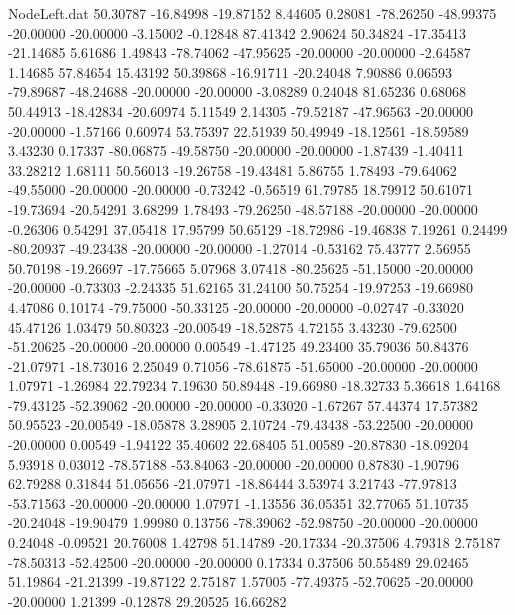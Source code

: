 \begin{filecontents}{NodeLeft.dat}
  50.30787  -16.84998  -19.87152     8.44605    0.28081  -78.26250  -48.99375  -20.00000  -20.00000   -3.15002   -0.12848   87.41342    2.90624
  50.34824  -17.35413  -21.14685     5.61686    1.49843  -78.74062  -47.95625  -20.00000  -20.00000   -2.64587    1.14685   57.84654   15.43192
  50.39868  -16.91711  -20.24048     7.90886    0.06593  -79.89687  -48.24688  -20.00000  -20.00000   -3.08289    0.24048   81.65236    0.68068
  50.44913  -18.42834  -20.60974     5.11549    2.14305  -79.52187  -47.96563  -20.00000  -20.00000   -1.57166    0.60974   53.75397   22.51939
  50.49949  -18.12561  -18.59589     3.43230    0.17337  -80.06875  -49.58750  -20.00000  -20.00000   -1.87439   -1.40411   33.28212    1.68111
  50.56013  -19.26758  -19.43481     5.86755    1.78493  -79.64062  -49.55000  -20.00000  -20.00000   -0.73242   -0.56519   61.79785   18.79912
  50.61071  -19.73694  -20.54291     3.68299    1.78493  -79.26250  -48.57188  -20.00000  -20.00000   -0.26306    0.54291   37.05418   17.95799
  50.65129  -18.72986  -19.46838     7.19261    0.24499  -80.20937  -49.23438  -20.00000  -20.00000   -1.27014   -0.53162   75.43777    2.56955
  50.70198  -19.26697  -17.75665     5.07968    3.07418  -80.25625  -51.15000  -20.00000  -20.00000   -0.73303   -2.24335   51.62165   31.24100
  50.75254  -19.97253  -19.66980     4.47086    0.10174  -79.75000  -50.33125  -20.00000  -20.00000   -0.02747   -0.33020   45.47126    1.03479
  50.80323  -20.00549  -18.52875     4.72155    3.43230  -79.62500  -51.20625  -20.00000  -20.00000    0.00549   -1.47125   49.23400   35.79036
  50.84376  -21.07971  -18.73016     2.25049    0.71056  -78.61875  -51.65000  -20.00000  -20.00000    1.07971   -1.26984   22.79234    7.19630
  50.89448  -19.66980  -18.32733     5.36618    1.64168  -79.43125  -52.39062  -20.00000  -20.00000   -0.33020   -1.67267   57.44374   17.57382
  50.95523  -20.00549  -18.05878     3.28905    2.10724  -79.43438  -53.22500  -20.00000  -20.00000    0.00549   -1.94122   35.40602   22.68405
  51.00589  -20.87830  -18.09204     5.93918    0.03012  -78.57188  -53.84063  -20.00000  -20.00000    0.87830   -1.90796   62.79288    0.31844
  51.05656  -21.07971  -18.86444     3.53974    3.21743  -77.97813  -53.71563  -20.00000  -20.00000    1.07971   -1.13556   36.05351   32.77065
  51.10735  -20.24048  -19.90479     1.99980    0.13756  -78.39062  -52.98750  -20.00000  -20.00000    0.24048   -0.09521   20.76008    1.42798
  51.14789  -20.17334  -20.37506     4.79318    2.75187  -78.50313  -52.42500  -20.00000  -20.00000    0.17334    0.37506   50.55489   29.02465
  51.19864  -21.21399  -19.87122     2.75187    1.57005  -77.49375  -52.70625  -20.00000  -20.00000    1.21399   -0.12878   29.20525   16.66282

\end{filecontents}
